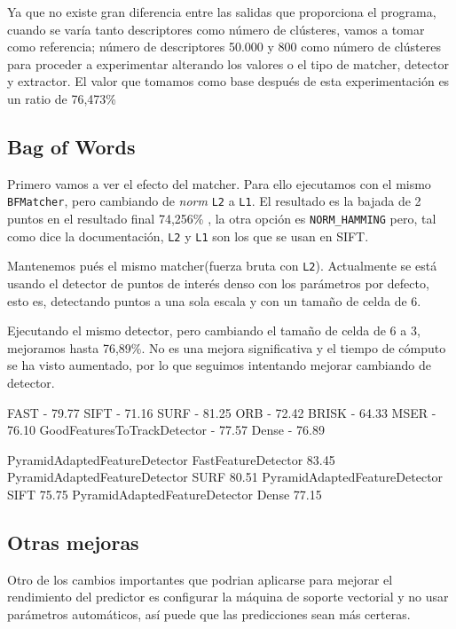 \documentclass[a4paper,12pt]{article}
\begin{document}
Ya que no existe gran diferencia entre las salidas que proporciona el programa,
cuando se varía tanto descriptores como número de clústeres, vamos a tomar como
referencia; número de descriptores 50.000 y 800 como número de clústeres para
proceder a experimentar alterando los valores o el tipo de matcher, detector y
extractor. El valor que tomamos como base después de esta experimentación es
un ratio de 76,473\%

\subsection{Bag of Words}

Primero vamos a ver el efecto del matcher. Para ello ejecutamos con el mismo
\texttt{BFMatcher}, pero cambiando de \emph{norm} \texttt{L2} a \texttt{L1}. El resultado es la bajada de
2 puntos en el resultado final 74,256\% , la otra opción es \texttt{NORM\_HAMMING}
pero, tal como dice la documentación, \texttt{L2} y \texttt{L1} son los que se usan en SIFT.

Mantenemos pués el mismo matcher(fuerza bruta con \texttt{L2}).
Actualmente se está usando el detector de puntos de interés denso con los 
parámetros por defecto, esto es, detectando puntos a una sola escala y con un
tamaño de celda de 6. 

Ejecutando el mismo detector, pero cambiando el tamaño de  celda de 6 a 3, 
mejoramos hasta 76,89\%. No es una mejora significativa y el tiempo
de cómputo se ha visto aumentado, por lo que seguimos intentando mejorar 
cambiando de detector. 


FAST - 79.77
SIFT - 71.16
SURF - 81.25
ORB - 72.42
BRISK - 64.33
MSER - 76.10
GoodFeaturesToTrackDetector - 77.57
Dense - 76.89


PyramidAdaptedFeatureDetector FastFeatureDetector 83.45
PyramidAdaptedFeatureDetector SURF 80.51
PyramidAdaptedFeatureDetector SIFT 75.75
PyramidAdaptedFeatureDetector Dense 77.15


\subsection{Otras mejoras}

Otro de los cambios importantes que podrian aplicarse para mejorar el 
rendimiento del predictor es configurar la máquina de soporte vectorial y no 
usar parámetros automáticos, así puede que las predicciones sean más certeras.
\end{document}
